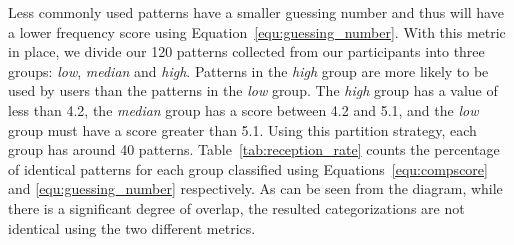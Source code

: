 

            Less commonly used patterns have a smaller guessing number and thus will have a lower frequency score using Equation~\ref{equ:guessing_number}. With
            this metric in place, we divide our 120 patterns collected from our participants into three groups:
            \emph{low}, \emph{median} and \emph{high}. Patterns in the \emph{high} group are more likely to be used by users than the patterns in the
            \emph{low} group. The \emph{high} group has a value of less than 4.2, the \emph{median} group
            has a score between 4.2 and 5.1, and the \emph{low} group must have a score greater than 5.1.
            Using this partition strategy, each group has around 40 patterns.
            Table~\ref{tab:reception_rate} counts the percentage of identical patterns
            for each group classified using Equations~\ref{equ:compscore} and \ref{equ:guessing_number} respectively.
            As can be seen from the diagram, while there is a significant degree of overlap,
            the resulted categorizations are not identical using the two different metrics.

